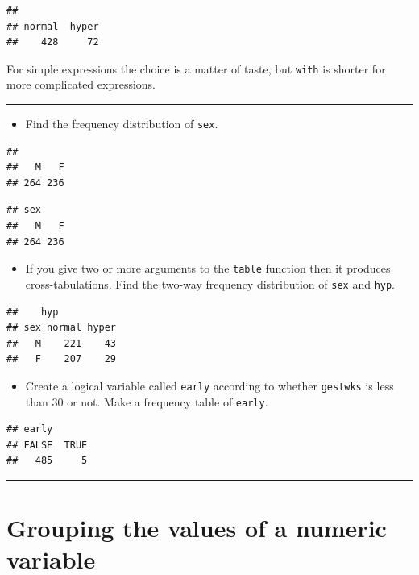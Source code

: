 \documentclass[
]{book}
\providecommand{\tightlist}{%
  \setlength{\itemsep}{0pt}\setlength{\parskip}{0pt}}
\begin{document}
\begin{verbatim}
## 
## normal  hyper 
##    428     72
\end{verbatim}

For simple expressions the choice is a matter of taste, but \texttt{with}
is shorter for more complicated expressions.

\begin{center}\rule{0.5\linewidth}{0.5pt}\end{center}

\begin{itemize}
\tightlist
\item
  Find the frequency distribution of \texttt{sex}.
\end{itemize}

\begin{verbatim}
## 
##   M   F 
## 264 236
\end{verbatim}

\begin{verbatim}
## sex
##   M   F 
## 264 236
\end{verbatim}

\begin{itemize}
\tightlist
\item
  If you give two or more arguments to the \texttt{table} function
  then it produces cross-tabulations. Find the two-way frequency
  distribution of \texttt{sex} and \texttt{hyp}.
\end{itemize}

\begin{verbatim}
##    hyp
## sex normal hyper
##   M    221    43
##   F    207    29
\end{verbatim}

\begin{itemize}
\tightlist
\item
  Create a logical variable called \texttt{early}
  according to whether \texttt{gestwks} is less than 30 or not. Make a frequency table of \texttt{early}.
\end{itemize}

\begin{verbatim}
## early
## FALSE  TRUE 
##   485     5
\end{verbatim}

\begin{center}\rule{0.5\linewidth}{0.5pt}\end{center}

\section{Grouping the values of a numeric variable}\label{grouping-the-values-of-a-numeric-variable}
\end{document}
